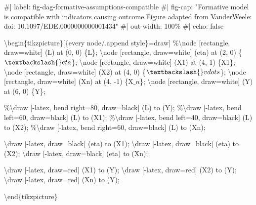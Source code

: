 \documentclass[
  letterpaper,
  DIV=11,
  numbers=noendperiod]{scrartcl}
\newenvironment{Shaded}{\begin{snugshade}}{\end{snugshade}}
\newcommand{\NormalTok}[1]{\textcolor[rgb]{0.00,0.23,0.31}{#1}}
\begin{document}
\begin{Shaded}
\begin{Highlighting}[]
\NormalTok{\#| label: fig{-}dag{-}formative{-}assumptions{-}compatible}
\NormalTok{\#| fig{-}cap: "Formative model is compatible with indicators causing outcome.Figure adapted from VanderWeele: doi: 10.1097/EDE.0000000000001434"}
\NormalTok{\#| out{-}width: 100\%}
\NormalTok{\#| echo: false}


\NormalTok{\textbackslash{}begin\{tikzpicture\}[\{every node/.append style\}=draw]}
\NormalTok{\%\textbackslash{}node [rectangle, draw=white] (L) at (0, 0) \{L\};}
\NormalTok{\textbackslash{}node [rectangle, draw=white] (eta) at (2, 0) \{$\textbackslash{}eta$\};}
\NormalTok{\textbackslash{}node [rectangle, draw=white] (X1) at (4, 1) \{X1\};}
\NormalTok{\textbackslash{}node [rectangle, draw=white] (X2) at (4, 0) \{$\textbackslash{}vdots$\};}
\NormalTok{\textbackslash{}node [rectangle, draw=white] (Xn) at (4, {-}1) \{X$\_n$\};}
\NormalTok{\textbackslash{}node [rectangle, draw=white] (Y) at (6, 0) \{Y\};}

\NormalTok{\%\textbackslash{}draw [{-}latex, bend right=80, draw=black] (L) to (Y);}
\NormalTok{\%\textbackslash{}draw [{-}latex, bend left=60, draw=black] (L) to (X1);}
\NormalTok{\%\textbackslash{}draw [{-}latex, bend left=40, draw=black] (L) to (X2);}
\NormalTok{\%\textbackslash{}draw [{-}latex, bend right=60, draw=black] (L) to (Xn);}

\NormalTok{\textbackslash{}draw [{-}latex, draw=black] (eta) to (X1);}
\NormalTok{\textbackslash{}draw [{-}latex, draw=black] (eta) to (X2);}
\NormalTok{\textbackslash{}draw [{-}latex, draw=black] (eta) to (Xn);}

\NormalTok{\textbackslash{}draw [{-}latex, draw=red] (X1) to (Y);}
\NormalTok{\textbackslash{}draw [{-}latex, draw=red] (X2) to (Y);}
\NormalTok{\textbackslash{}draw [{-}latex, draw=red] (Xn) to (Y);}


\NormalTok{\textbackslash{}end\{tikzpicture\}}
\end{Highlighting}
\end{Shaded}
\end{document}
